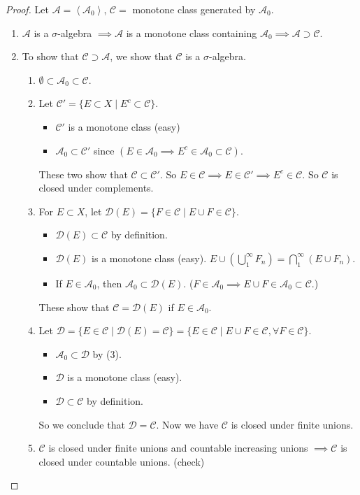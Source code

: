 \documentclass{report}
\newcommand{\cA}{\mathcal{A}}
\newcommand{\cC}{\mathcal{C}}
\newcommand{\gen}[1]{\left\langle #1 \right\rangle}
\theoremstyle{definition}
\theoremstyle{remark}
\begin{document}
\begin{proof}
	Let $\cA = \gen{\cA_0}$, $\mathcal{C} = $ monotone class generated by $\cA_0$.

	\begin{enumerate}
		\item $\cA$ is a $\sigma$-algebra $\implies \cA$ is a monotone class containing $\cA_0 \implies \cA \supset \mathcal{C}$.
		\item To show that $\mathcal{C} \supset \cA$, we show that $\mathcal{C}$ is a $\sigma$-algebra. \begin{enumerate}
			\item $\emptyset \subset \cA_0 \subset \mathcal{C}$.
			\item Let $\cC' = \{E \subset X \mid E^c \subset \cC\}$. \begin{itemize}
				\item $\cC'$ is a monotone class (easy)
				\item $\cA_0 \subset \cC'$ since $(E \in \cA_0 \implies E^c \in \cA_0 \subset \cC)$.
			\end{itemize}
			These two show that $\cC \subset \cC'$. So $E \in \cC \implies E \in \cC' \implies E^c \in \cC$. So $\cC$ is closed under complements.
			\item For $E \subset X$, let $\mathcal{D}(E) = \{F \in \cC \mid E \cup F \in \cC\}$. \begin{itemize}
				\item $\mathcal{D}(E) \subset \cC$ by definition.
				\item $\mathcal{D}(E)$ is a monotone class (easy). $E \cup \left(\bigcup_1^\infty F_n\right) = \bigcap_1^\infty \left(E \cup F_n\right)$.
				\item  If $E \in \cA_0$, then $\cA_0 \subset \mathcal{D}(E)$. ($F \in \cA_0 \implies E \cup F \in \cA_0 \subset \cC$.)
			\end{itemize}
			These show that $\cC = \mathcal{D}(E)$ if $E \in \cA_0$.
			\item Let $\mathcal{D} = \{E \in \cC \mid \mathcal{D}(E) = \cC\} = \{E \in \cC \mid E \cup F \in \cC, \forall F \in \cC\}$. \begin{itemize}
				\item $\cA_0 \subset \mathcal{D}$ by (3).
				\item $\mathcal{D}$ is a monotone class (easy).
				\item $\mathcal{D} \subset \cC$ by definition.
			\end{itemize}
			So we conclude that $\mathcal{D} = \cC$.
			Now we have $\cC$ is closed under finite unions.
			\item $\cC$ is closed under finite unions and countable increasing unions $\implies \cC$ is closed under countable unions. (check) \qedhere
		\end{enumerate}
	\end{enumerate}
\end{proof}
\end{document}
